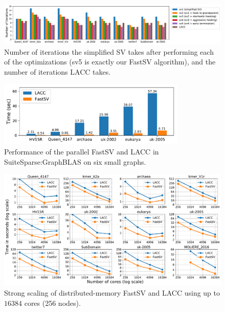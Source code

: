 \documentclass{sokendai_thesis} %
\newcommand{\Name}[0]{FastSV} %
\begin{document}
\begin{figure}[t]
\centering
\includegraphics[width=1.0\textwidth]{figures/sv_iters.pdf}
\vspace{-20pt}
\caption{Number of iterations the simplified SV takes after performing each of the optimizations (sv5 is exactly our \Name{} algorithm), and the number of iterations LACC takes.}
\vspace{-10pt}
\label{fig:sv-iters}
\end{figure}

\begin{figure}[t]
\centering
\includegraphics[width=0.8\textwidth]{figures/LAGraph.pdf}
\vspace{-5pt}
\caption{Performance of the parallel \Name{} and LACC in SuiteSparse:GraphBLAS on six small graphs.}
\vspace{-10pt}
\label{fig:LAGraph}
\end{figure}

\begin{figure}[t]
\centering
\includegraphics[width=\textwidth]{figures/scalability.pdf}
\vspace{-5pt}
\caption{Strong scaling of distributed-memory \Name{} and LACC using up to $16384$ cores (256 nodes).}
\vspace{-10pt}
\label{fig:scalability}
\end{figure}
\end{document}
